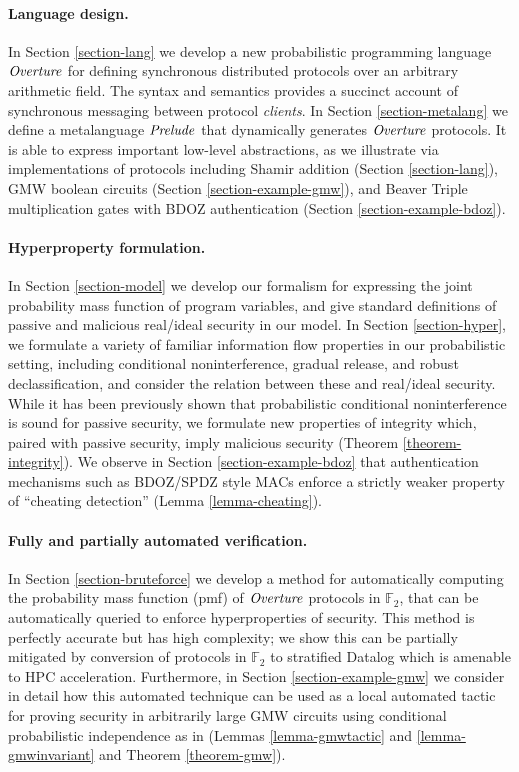 \paragraph{Language design.} In Section \ref{section-lang} we
develop a new probabilistic programming language $\mathit{Overture}$ for
defining synchronous distributed protocols over an arbitrary
arithmetic field. The syntax and semantics provides a succinct account
of synchronous messaging between protocol \emph{clients}. In Section
\ref{section-metalang} we define a metalanguage $\mathit{Prelude}$ that
dynamically generates $\mathit{Overture}$ protocols. It is able to express
important low-level abstractions, as we illustrate via implementations
of protocols including Shamir addition (Section \ref{section-lang}),
GMW boolean circuits (Section \ref{section-example-gmw}), and Beaver
Triple multiplication gates with BDOZ authentication (Section
\ref{section-example-bdoz}).

\paragraph{Hyperproperty formulation.} In Section \ref{section-model} we
develop our formalism for expressing the joint probability mass function of
program variables, and give standard definitions of passive and
malicious real/ideal security in our model. In Section
\ref{section-hyper}, we formulate a variety of familiar information
flow properties in our probabilistic setting, including conditional
noninterference, gradual release, and robust declassification, and
consider the relation between these and real/ideal security.  While it
has been previously shown that probabilistic conditional
noninterference is sound for passive security, we formulate new
properties of integrity which, paired with passive security, imply
malicious security (Theorem \ref{theorem-integrity}). We observe
in Section \ref{section-example-bdoz} that authentication mechanisms
such as BDOZ/SPDZ style MACs enforce a strictly weaker property
of ``cheating detection'' (Lemma \ref{lemma-cheating}). 


\paragraph{Fully and partially automated verification.} In Section
\ref{section-bruteforce} we develop a method for automatically
computing the probability mass function (pmf) of $\mathit{Overture}$ protocols
in $\mathbb{F}_2$, that can be automatically queried to enforce
hyperproperties of security. This method is perfectly accurate but has
high complexity; we show this can be partially mitigated by conversion
of protocols in $\mathbb{F}_2$ to stratified Datalog which is amenable
to HPC acceleration. Furthermore, in Section \ref{section-example-gmw}
we consider in detail how this automated technique can be used as a
local automated tactic for proving security in arbitrarily large GMW
circuits using conditional probabilistic independence as in
\cite{li2023lilac} (Lemmas \ref{lemma-gmwtactic} and
\ref{lemma-gmwinvariant} and Theorem \ref{theorem-gmw}).

